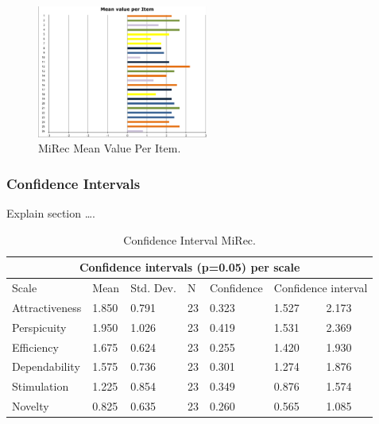 \begin{figure}[t]
\centering
\includegraphics[width=0.5\textwidth]{figures/mirec-results3}
\caption{MiRec Mean Value Per Item.}
\label{fig:figure56}
\end{figure}

\subsubsection{Confidence Intervals}
Explain section \ldots.

\begin{table}[t]
\centering
\begin{tabular}{|l|l|l|l|l|l|l|}
\hline
\multicolumn{7}{|c|}{\textbf{Confidence intervals (p=0.05) per scale}}                            \\ \hline
Scale           & Mean   & Std. Dev. & N  & Confidence & \multicolumn{2}{l|}{Confidence interval} \\ \hline
Attractiveness  & 1.850  & 0.791     & 23 & 0.323      & 1.527               & 2.173              \\ \hline
Perspicuity     & 1.950  & 1.026     & 23 & 0.419      & 1.531               & 2.369              \\ \hline
Efficiency      & 1.675  & 0.624     & 23 & 0.255      & 1.420               & 1.930              \\ \hline
Dependability   & 1.575  & 0.736     & 23 & 0.301      & 1.274               & 1.876              \\ \hline
Stimulation     & 1.225  & 0.854     & 23 & 0.349      & 0.876               & 1.574              \\ \hline
Novelty         & 0.825  & 0.635     & 23 & 0.260      & 0.565               & 1.085              \\ \hline
\end{tabular}
\caption{Confidence Interval MiRec.}
\label{table:table55}
\end{table}

